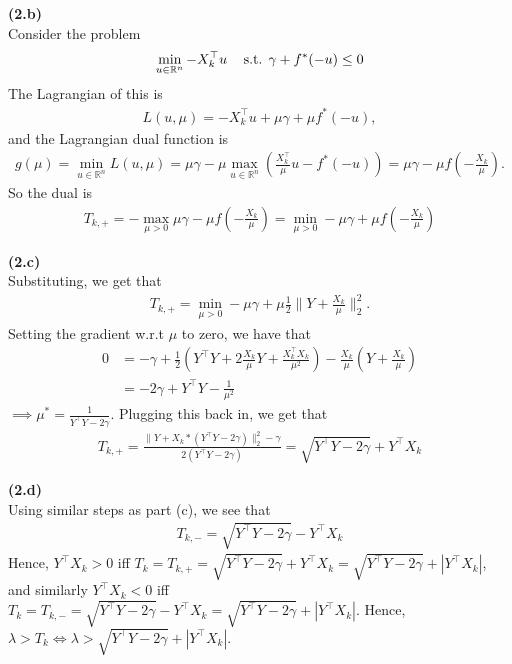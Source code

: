 \textbf{(2.b)}\\
Consider the problem
\begin{align*}
    \min_{u \in \mathbb{R}^n} -X_k^\top u \hspace{3mm}\text{ s.t. } \gamma + f^*(-u) \leq 0
\end{align*}
The Lagrangian of this is
\begin{align*}
    L(u,\mu) = -X_k^\top u + \mu\gamma + \mu f^*(-u),
\end{align*}
and the Lagrangian dual function is
\begin{align*}
    g(\mu) = \min_{u \in \mathbb{R}^n} L(u,\mu) = \mu\gamma - 
    \mu \max_{u \in \mathbb{R}^n} \left( \frac{X_k^\top}{\mu}u - f^*(-u) \right)
    = \mu \gamma - \mu f\left(-\frac{X_k}{\mu}\right).
\end{align*}
So the dual is 
\begin{align*}
    T_{k,+} = 
    - \max_{\mu > 0} \mu \gamma - \mu f\left(-\frac{X_k}{\mu}\right)
    = \min_{\mu > 0} - \mu \gamma + \mu f\left(-\frac{X_k}{\mu}\right) 
\end{align*}


\textbf{(2.c)}\\
Substituting, we get that 
\begin{align*}
    T_{k,+} = \min_{\mu > 0} - \mu \gamma + \mu \frac{1}{2} \| Y + \frac{X_k}{\mu} \|_2^2.
\end{align*}
Setting the gradient w.r.t $\mu$ to zero, we have that
\begin{align*}
    0 &= -\gamma + \frac{1}{2}\left(Y^\top Y + 2\frac{X_k}{\mu}Y + \frac{X_k^\top X_k}{\mu^2} \right)
    - \frac{X_k}{\mu}\left(Y + \frac{X_k}{\mu}\right) \\
    &= -2\gamma + Y^\top Y - \frac{1}{\mu^2}
\end{align*}
$\implies \mu^* = \frac{1}{Y^\top Y - 2\gamma}$. Plugging this back in, we get that 
\begin{align*}
    T_{k,+} = 
    \frac{ \| Y + X_k * (Y^\top Y - 2\gamma) \|_2^2 - \gamma}{2(Y^\top Y - 2\gamma)}
    = \sqrt{Y^\top Y - 2\gamma} + Y^\top X_k
\end{align*}


\textbf{(2.d)}\\
Using similar steps as part (c), we see that 
\begin{align*}
    T_{k,-} = \sqrt{Y^\top Y - 2\gamma} - Y^\top X_k
\end{align*}
Hence, $Y^\top X_k > 0$ iff $T_k = T_{k,+} = \sqrt{Y^\top Y - 2\gamma} +
Y^\top X_k = \sqrt{Y^\top Y - 2\gamma} + |Y^\top X_k|$, 
and similarly
$Y^\top X_k < 0$ iff $T_k = T_{k,-} = \sqrt{Y^\top Y - 2\gamma} - Y^\top X_k
= \sqrt{Y^\top Y - 2\gamma} + |Y^\top X_k|$.
Hence, $\lambda > T_k \iff \lambda > \sqrt{Y^\top Y - 2\gamma} + |Y^\top X_k|$.


